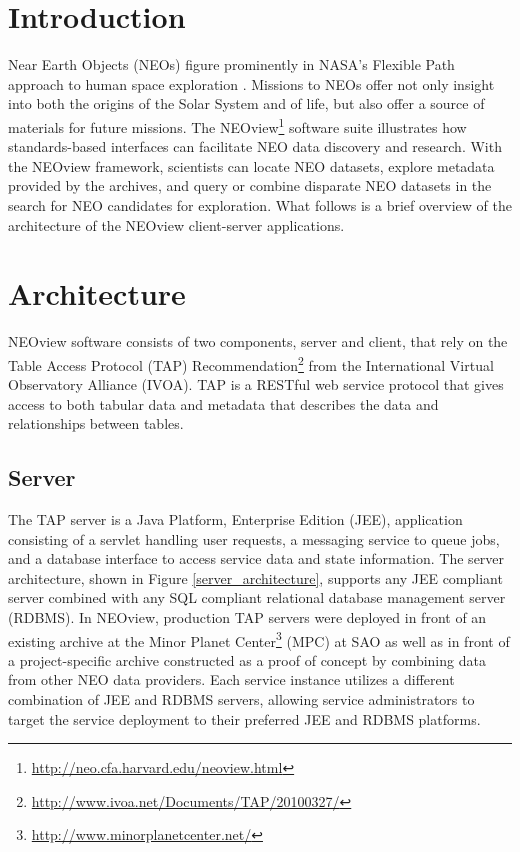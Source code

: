 \section{Introduction}
Near Earth Objects (NEOs) figure prominently in NASA's Flexible Path approach to human space exploration \citep{flexible_path}.  Missions to NEOs offer not only insight into both the origins of the Solar System and of life, but also offer a source of materials for future missions.  The NEOview\footnote{\url{http://neo.cfa.harvard.edu/neoview.html}} software suite illustrates how standards-based interfaces can facilitate NEO data discovery and research.  With the NEOview framework, scientists can locate NEO datasets, explore metadata provided by the archives, and query or combine disparate NEO datasets in the search for NEO candidates for exploration.  What follows is a brief overview of the architecture of the NEOview client-server applications.

\section{Architecture}
NEOview software consists of two components, server and client, that rely on the Table Access Protocol (TAP) Recommendation\footnote{\url{http://www.ivoa.net/Documents/TAP/20100327/}} from the International Virtual Observatory Alliance (IVOA).  TAP is a RESTful web service protocol that gives access to both tabular data and metadata that describes the data and relationships between tables.

\subsection{Server}
The TAP server is a Java Platform, Enterprise Edition (JEE), application consisting of a servlet handling user requests, a messaging service to queue jobs, and a database interface to access service data and state information.  The server architecture, shown in Figure \ref{server_architecture}, supports any JEE compliant server combined with any SQL compliant relational database management server (RDBMS).  In NEOview, production TAP servers were deployed in front of an existing archive at the Minor Planet Center\footnote{\url{http://www.minorplanetcenter.net/}} (MPC) at SAO as well as in front of a project-specific archive constructed as a proof of concept by combining data from other NEO data providers.  Each service instance utilizes a different combination of JEE and RDBMS servers, allowing service administrators to target the service deployment to their preferred JEE and RDBMS platforms.

